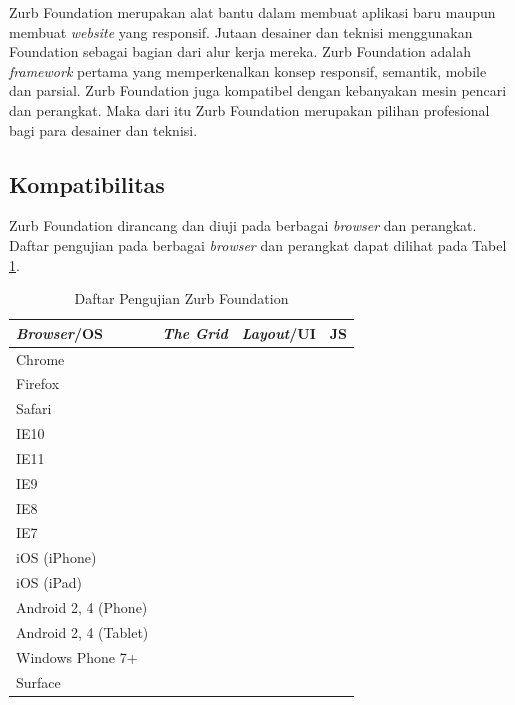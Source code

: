 Zurb Foundation merupakan alat bantu dalam membuat aplikasi baru maupun membuat
{\it website} yang responsif. Jutaan desainer dan teknisi menggunakan Foundation
sebagai bagian dari alur kerja mereka. Zurb Foundation adalah {\it framework}
pertama yang memperkenalkan konsep responsif, semantik, mobile dan parsial. Zurb
Foundation juga kompatibel dengan kebanyakan mesin pencari dan perangkat. Maka
dari itu Zurb Foundation merupakan pilihan profesional bagi para desainer dan teknisi.

\subsection{Kompatibilitas}
Zurb Foundation dirancang dan diuji pada berbagai {\it browser} dan perangkat. Daftar
pengujian pada berbagai {\it browser} dan perangkat dapat dilihat pada Tabel
\ref{tab:kompatibilitas}.

\newcommand{\cmark}{\ding{51}}%
\newcommand{\xmark}{\ding{55}}%
\begin{table}
\centering
\caption[Tabel Daftar Pengujian Zurb Foundation]{Daftar Pengujian Zurb
Foundation\footnotemark[1]}
\label{tab:kompatibilitas}
\begin{tabular}{|l|l|l|l|}
\hline
{\it Browser}/OS & {\it The Grid} & {\it Layout}/UI & JS\\
\hline
Chrome & \cmark & \cmark & \cmark\\
\hline
Firefox & \cmark & \cmark & \cmark\\
\hline
Safari & \cmark & \cmark & \cmark\\
\hline
IE10 & \cmark & \cmark & \cmark\\
\hline
IE11 & \cmark & \cmark & \cmark\\
\hline
IE9 & \cmark & \cmark & \cmark\\
\hline
IE8 & \xmark & \xmark & \xmark\\
\hline
IE7 & \xmark & \xmark & \xmark\\
\hline
iOS (iPhone) & \cmark & \cmark & \cmark\\
\hline
iOS (iPad) & \cmark & \cmark & \cmark\\
\hline
Android 2, 4 (Phone) & \cmark & \cmark & \cmark\\
\hline
Android 2, 4 (Tablet) & \cmark & \cmark & \cmark\\
\hline
Windows Phone 7+ & \cmark & \cmark & \cmark\\
\hline
Surface & \cmark & \cmark & \cmark\\
\hline
\end{tabular}
\end{table}

